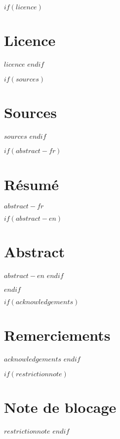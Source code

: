 
\renewcommand{\contentsname}{Table des matières}


\renewcommand{\figurename}{Illustration}

$if(licence)$
\chapter*{Licence}
$licence$
$endif$

$if(sources)$
\chapter*{Sources}
$sources$
$endif$

$if(abstract-fr)$
\cleardoublepage
\begin{minipage}{\linewidth}

\chapter*{Résumé}
$abstract-fr$

$if(abstract-en)$
\chapter*{Abstract}
$abstract-en$
$endif$

\end{minipage}
\cleardoublepage
$endif$

$if(acknowledgements)$
\chapter*{Remerciements}
$acknowledgements$
$endif$



$if(restrictionnote)$
\chapter*{Note de blocage}
$restrictionnote$
$endif$



\cleardoublepage
